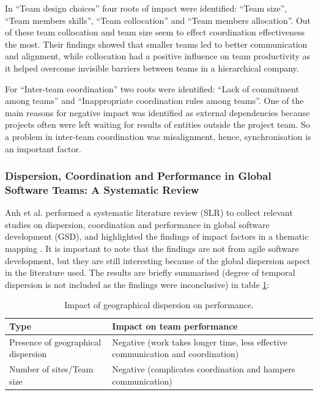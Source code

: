 In ``Team design choices'' four roots of impact were identified: ``Team size'', ``Team members skills'', ``Team collocation'' and ``Team members allocation''. Out of these team collocation and team size seem to effect coordination effectiveness the most. Their findings showed that smaller teams led to better communication and alignment, while collocation had a positive influence on team productivity as it helped overcome invisible barriers between teams in a hierarchical company.

For ``Inter-team coordination'' two roots were identified: ``Lack of commitment among teams'' and ``Inappropriate coordination rules among teams''. One of the main reasons for negative impact was identified as external dependencies because projects often were left waiting for results of entities outside the project team. So a problem in inter-team coordination was misalignment, hence, synchronisation is an important factor.

\subsubsection{Dispersion, Coordination and Performance in Global Software Teams: A Systematic Review}

Anh et al. performed a systematic literature review (SLR) to collect relevant studies on dispersion, coordination and performance in global software development (GSD), and highlighted the findings of impact factors in a thematic mapping \cite{Anh2012}. It is important to note that the findings are not from agile software development, but they are still interesting because of the global dispersion aspect in the literature used. The results are briefly summarised (degree of temporal dispersion is not included as the findings were inconclusive) in table \ref{GSD}:

\begin{table}[H]
\begin{center}
    \begin{tabular}{ | p{5cm} | p{8cm} |}
    \hline
    \textbf{Type} & \textbf{Impact on team performance} \\ \hline
    Presence of geographical dispersion & Negative (work takes longer time, less effective communication and coordination) \\ \hline
    Number of sites/Team size & Negative (complicates coordination and hampers communication) \\ \hline
    \end{tabular}
    \caption{Impact of geographical dispersion on performance.}
    \label{GSD}
\end{center}
\end{table}

